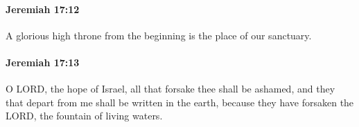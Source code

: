 		\paragraph{Jeremiah 17:12} %
			\label{JEREMIAH-17-12}

			A glorious high throne from the beginning is the place of our sanctuary.


		\paragraph{Jeremiah 17:13} %
			\label{JEREMIAH-17-13}

			O LORD, the hope of Israel, all that forsake thee shall be ashamed, and they that depart from me shall be written in the earth, because they have forsaken the LORD, the fountain of living waters.


